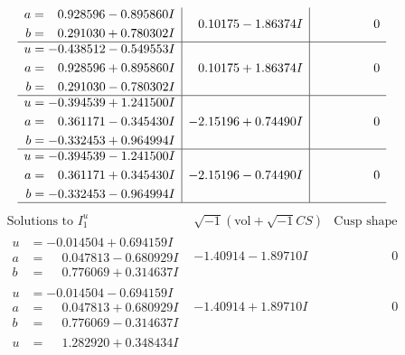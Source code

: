 \documentclass[1p]{elsarticle_modified}
\theoremstyle{definition}
\newcommand{\I}{\sqrt{-1}}
\begin{document}
$$\begin{array}{c|c|c}
\begin{aligned}
a &= \phantom{-}0.928596 - 0.895860 I \\
b &= \phantom{-}0.291030 + 0.780302 I\end{aligned}
 & \phantom{-}0.10175 - 1.86374 I & \phantom{-0.000000 } 0 \\ \hline\begin{aligned}
u &= -0.438512 - 0.549553 I \\
a &= \phantom{-}0.928596 + 0.895860 I \\
b &= \phantom{-}0.291030 - 0.780302 I\end{aligned}
 & \phantom{-}0.10175 + 1.86374 I & \phantom{-0.000000 } 0 \\ \hline\begin{aligned}
u &= -0.394539 + 1.241500 I \\
a &= \phantom{-}0.361171 - 0.345430 I \\
b &= -0.332453 + 0.964994 I\end{aligned}
 & -2.15196 + 0.74490 I & \phantom{-0.000000 } 0 \\ \hline\begin{aligned}
u &= -0.394539 - 1.241500 I \\
a &= \phantom{-}0.361171 + 0.345430 I \\
b &= -0.332453 - 0.964994 I\end{aligned}
 & -2.15196 - 0.74490 I & \phantom{-0.000000 } 0\\
 \hline 
 \end{array}$$\newpage$$\begin{array}{c|c|c}  
\text{Solutions to }I^u_{1}& \I (\text{vol} + \sqrt{-1}CS) & \text{Cusp shape}\\
 \hline 
\begin{aligned}
u &= -0.014504 + 0.694159 I \\
a &= \phantom{-}0.047813 - 0.680929 I \\
b &= \phantom{-}0.776069 + 0.314637 I\end{aligned}
 & -1.40914 - 1.89710 I & \phantom{-0.000000 } 0 \\ \hline\begin{aligned}
u &= -0.014504 - 0.694159 I \\
a &= \phantom{-}0.047813 + 0.680929 I \\
b &= \phantom{-}0.776069 - 0.314637 I\end{aligned}
 & -1.40914 + 1.89710 I & \phantom{-0.000000 } 0 \\ \hline\begin{aligned}
u &= \phantom{-}1.282920 + 0.348434 I \\

\end{aligned}
\end{array}$$
\end{document}
